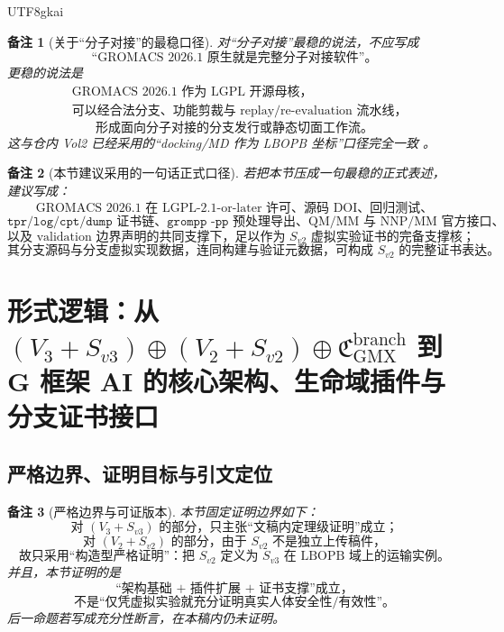 \documentclass[12pt]{article}
\newtheorem{remark}{备注}[section]
\begin{document}
\begin{CJK*}{UTF8}{gkai}
\begin{remark}[关于“分子对接”的最稳口径]
对“分子对接”最稳的说法，不应写成
\[
  \text{“GROMACS 2026.1 原生就是完整分子对接软件”。}
\]
更稳的说法是
\[
  \boxed{
    \begin{aligned}
      &\text{GROMACS 2026.1 作为 LGPL 开源母核，}\\
      &\text{可以经合法分支、功能剪裁与 replay/re-evaluation 流水线，}
    \end{aligned}
  }
\]
\[
  \boxed{
    \text{形成面向分子对接的分支发行或静态切面工作流。}
  }
\]
这与仓内 Vol2 已经采用的“docking/MD 作为 LBOPB 坐标”口径完全一致
\cite{GaoZhengAppVol2}。
\end{remark}

\begin{remark}[本节建议采用的一句话正式口径]
若把本节压成一句最稳的正式表述，
建议写成：
\[
  \boxed{
    \text{GROMACS 2026.1 在 LGPL-2.1-or-later 许可、源码 DOI、回归测试、}
  }
\]
\[
  \boxed{
    \texttt{tpr/log/cpt/dump}\text{ 证书链、}\texttt{grompp -pp}\text{ 预处理导出、}
    \text{QM/MM 与 NNP/MM 官方接口、}
  }
\]
\[
  \boxed{
    \text{以及 validation 边界声明的共同支撑下，}
    \text{足以作为 }S_{v2}\text{ 虚拟实验证书的完备支撑核；}
  }
\]
\[
  \boxed{
    \text{其分支源码与分支虚拟实现数据，连同构建与验证元数据，可构成 }S_{v2}\text{ 的完整证书表达。}
  }
\]
\end{remark}

\section{形式逻辑：从 \texorpdfstring{$(V_3+S_{v3})\oplus(V_2+S_{v2})\oplus\mathfrak C_{\mathrm{GMX}}^{\mathrm{branch}}$}
  {(V3+S-v3)+(V2+S-v2)+C-GMX-branch} 到 G 框架 AI 的核心架构、生命域插件与分支证书接口}
\label{sec:tex39-ch3}

\subsection{严格边界、证明目标与引文定位}
\label{subsec:tex39-ch3-convention}

\begin{remark}[严格边界与可证版本]
本节固定证明边界如下：
\[
  \boxed{
    \text{对 }(V_3+S_{v3})\text{ 的部分，只主张“文稿内定理级证明”成立；}
  }
\]
\[
  \boxed{
    \text{对 }(V_2+S_{v2})\text{ 的部分，由于 }S_{v2}\text{ 不是独立上传稿件，}
  }
\]
\[
  \boxed{
    \text{故只采用“构造型严格证明”：把 }S_{v2}\text{ 定义为 }S_{v3}
    \text{ 在 LBOPB 域上的运输实例。}
  }
\]
并且，本节证明的是
\[
  \boxed{
    \text{“架构基础 + 插件扩展 + 证书支撑”成立，}
  }
\]
\[
  \boxed{
    \text{不是“仅凭虚拟实验就充分证明真实人体安全性/有效性”。}
  }
\]
后一命题若写成充分性断言，在本稿内仍未证明。
\end{remark}


\end{CJK*}
\end{document}
